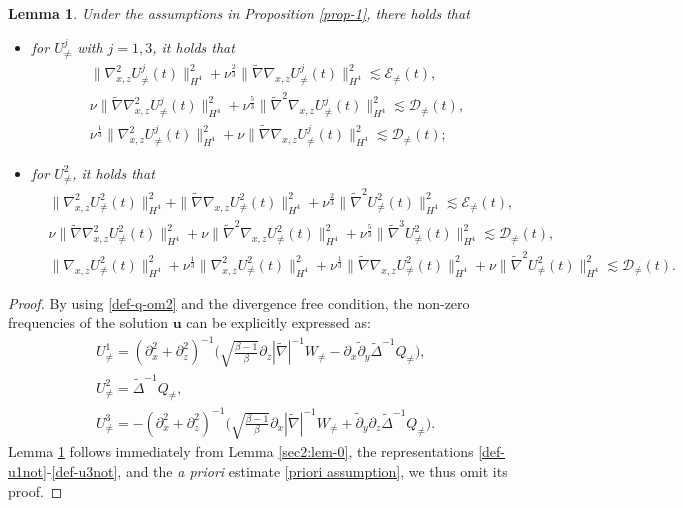 \documentclass[11pt,reqno]{article}
\newtheorem{lemm}[theo]{Lemma}
\numberwithin{equation}{section}
\newcommand\D{{\mathcal D}}
\newcommand\E{{\mathcal E}}
\newcommand\uu{\bm{u}}
\let\pa=\partial
\let\f=\frac
\begin{document}
\begin{lemm}\label{3lem-key}
Under the assumptions in Proposition \ref{prop-1}, there holds that
\begin{itemize}
	\item [(1)] for $U^j_{\not=}$ with $j=1,3$, it holds that
	\begin{align*}
		&\|\nabla_{x,z}^2U_{\not=}^{j}(t)\|_{H^4}^2
		+\nu^{\f23}\|\widetilde{\nabla}\nabla_{x,z}U_{\not=}^{j}(t)\|_{H^4}^2
		\lesssim \E_{\not=}(t),
		\\
		&\nu\|\widetilde{\nabla}\nabla_{x,z}^2U_{\not=}^{j}(t)\|_{H^4}^2
		+\nu^{\f53}\|\widetilde{\nabla}^2\nabla_{x,z}U_{\not=}^{j}(t)\|_{H^4}^2
		\lesssim \D_{\not=}(t),
		\\
		&\nu^{\f13}\|\nabla_{x,z}^2U_{\not=}^{j}(t)\|_{H^4}^2
		+\nu\|\widetilde{\nabla}\nabla_{x,z}U_{\not=}^{j}(t)\|_{H^4}^2
		\lesssim \D_{\not=}(t);
	\end{align*}
	\item [(2)] for $U^2_{\not=}$, it holds that
	\begin{align*}
		&\|\nabla_{x,z}^2U_{\not=}^{2}(t)\|_{H^4}^2
		+\|\widetilde{\nabla}\nabla_{x,z}U_{\not=}^{2}(t)\|_{H^4}^2
		+\nu^{\f23}\|\widetilde{\nabla}^2U_{\not=}^{2}(t)\|_{H^4}^2
		\lesssim \E_{\not=}(t),
		\\
		&
		\nu \|\widetilde{\nabla}\nabla_{x,z}^2U_{\not=}^{2}(t)\|_{H^4}^2
		+\nu\|\widetilde{\nabla}^2\nabla_{x,z}U_{\not=}^{2}(t)\|_{H^4}^2
		+\nu^{\f53}\|\widetilde{\nabla}^3U_{\not=}^{2}(t)\|_{H^4}^2
		\lesssim \D_{\not=}(t),
		\\
		&\|\nabla_{x,z}U_{\not=}^{2}(t)\|_{H^4}^2
		+
		\nu^{\f13}\|\nabla_{x,z}^2U_{\not=}^{2}(t)\|_{H^4}^2
		+\nu^{\f13}\|\widetilde{\nabla}\nabla_{x,z}U_{\not=}^{2}(t)\|_{H^4}^2
		+\nu\|\widetilde{\nabla}^2U_{\not=}^{2}(t)\|_{H^4}^2
		\lesssim \D_{\not=}(t).
	\end{align*}
\end{itemize}
\end{lemm}
\begin{proof}
By using \eqref{def-q-om2} and the divergence free condition, the non-zero frequencies of the solution $\uu$ can be explicitly expressed as:
\begin{align}
	&U^1_{\not=} =(\pa_{x}^2+\pa_{z}^2)^{-1}\Big(\sqrt{\f{\beta-1}{\beta}}\pa_z |\widetilde{\nabla}|^{-1}W_{\not=}-\pa_{x}\tilde{\pa}_{y} \widetilde{\Delta}^{-1}Q_{\not=}\Big),
	\label{def-u1not}
	\\
	&U^2_{\not=}=\widetilde{\Delta}^{-1}Q_{\not=},
	\label{def-u2not}
	\\
	&U^3_{\not=} =-(\pa_{x}^2+\pa_{z}^2)^{-1}\Big(\sqrt{\f{\beta-1}{\beta}}\pa_{x} |\widetilde{\nabla}|^{-1}W_{\not=}+\tilde{\pa}_{y}\pa_{z} \widetilde{\Delta}^{-1}Q_{\not=}\Big).
	\label{def-u3not}
\end{align}
Lemma \ref{3lem-key} follows immediately from Lemma \ref{sec2:lem-0}, the representations \eqref{def-u1not}-\eqref{def-u3not}, and the \textit{a priori} estimate \eqref{priori assumption}, we thus omit its proof.
\end{proof}
\end{document}
